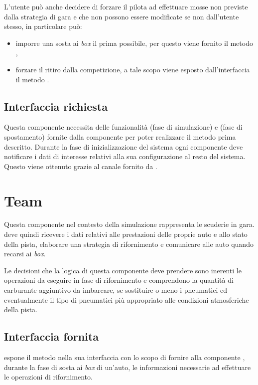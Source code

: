 L'utente può anche decidere di forzare il pilota ad effettuare mosse non previste dalla strategia di gara e che non possono essere modificate se non dall'utente stesso, in particolare può:
\begin{itemize}
\item imporre una sosta ai \textit{box} il prima possibile, per questo viene fornito il metodo ,
\item forzare il ritiro dalla competizione, a tale scopo viene esposto dall'interfaccia il metodo .
\end{itemize}

\subsection*{Interfaccia richiesta}
Questa componente necessita delle funzionalità  (fase di simulazione) e  (fase di spostamento) fornite dalla componente \track{} per poter realizzare il metodo  prima descritto.
Durante la fase di inizializzazione del sistema ogni componente \car{} deve notificare i dati di interesse relativi alla sua configurazione al resto del sistema. Questo viene ottenuto grazie al canale  fornito da \evdisp{}.

\section{Team}
Questa componente nel contesto della simulazione rappresenta le scuderie in gara. \team{} deve quindi ricevere i dati relativi alle prestazioni delle proprie auto e allo stato della pista, elaborare una strategia di rifornimento e comunicare alle auto quando recarsi ai \textit{box}.

Le decisioni che la logica di questa componente deve prendere sono inerenti le operazioni da eseguire in fase di rifornimento e comprendono la quantità di carburante aggiuntivo da imbarcare, se sostituire o meno i pneumatici ed eventualmente il tipo di pneumatici più appropriato alle condizioni atmosferiche della pista.

\subsection*{Interfaccia fornita}
\team{} espone il metodo  nella sua interfaccia con lo scopo di fornire alla componente \track{}, durante la fase di sosta ai \textit{box} di un'auto, le informazioni necessarie ad effettuare le operazioni di rifornimento.

